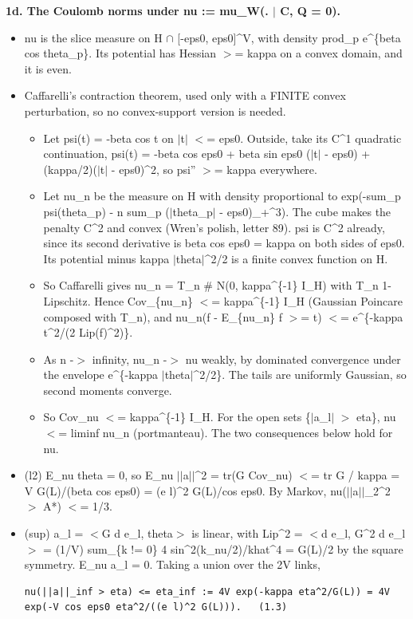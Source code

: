 \documentclass[11pt,a4paper]{article}
\begin{document}
{\bfseries\boldmath 1d. The Coulomb norms under nu := mu\_W(. $|$ C, Q = 0).}

\begin{itemize}
\item{} nu is the slice measure on H $\cap$ [-eps0, eps0]\textasciicircum{}V, with density prod\_p e\textasciicircum{}\{beta cos theta\_p\}. Its potential has Hessian
$>$= kappa on a convex domain, and it is even.
\item{} Caffarelli's contraction theorem, used only with a FINITE convex perturbation, so no convex-support version is
needed.
\begin{itemize}
\item{} Let psi(t) = -beta cos t on $|$t$|$ $<$= eps0. Outside, take its C\textasciicircum{}1 quadratic continuation,
psi(t) = -beta cos eps0 + beta sin eps0 ($|$t$|$ - eps0) + (kappa/2)($|$t$|$ - eps0)\textasciicircum{}2, so psi'' $>$= kappa everywhere.
\item{} Let nu\_n be the measure on H with density proportional to
exp(-sum\_p psi(theta\_p) - n sum\_p ($|$theta\_p$|$ - eps0)\_+\textasciicircum{}3).
The cube makes the penalty C\textasciicircum{}2 and convex (Wren's polish, letter 89). psi is C\textasciicircum{}2 already, since its second
derivative is beta cos eps0 = kappa on both sides of eps0.
Its potential minus kappa $|$theta$|$\textasciicircum{}2/2 is a finite convex function on H.
\item{} So Caffarelli gives nu\_n = T\_n \# N(0, kappa\textasciicircum{}\{-1\} I\_H) with T\_n 1-Lipschitz. Hence Cov\_\{nu\_n\} $<$= kappa\textasciicircum{}\{-1\} I\_H
(Gaussian Poincare composed with T\_n), and nu\_n(f - E\_\{nu\_n\} f $>$= t) $<$= e\textasciicircum{}\{-kappa t\textasciicircum{}2/(2 Lip(f)\textasciicircum{}2)\}.
\item{} As n -$>$ infinity, nu\_n -$>$ nu weakly, by dominated convergence under the envelope e\textasciicircum{}\{-kappa $|$theta$|$\textasciicircum{}2/2\}.
The tails are uniformly Gaussian, so second moments converge.
\item{} So Cov\_nu $<$= kappa\textasciicircum{}\{-1\} I\_H. For the open sets \{$|$a\_l$|$ $>$ eta\}, nu $<$= liminf nu\_n (portmanteau). The two
consequences below hold for nu.
\end{itemize}

\item{} (l2) E\_nu theta = 0, so E\_nu $|$$|$a$|$$|$\textasciicircum{}2 = tr(G Cov\_nu) $<$= tr G / kappa = V G(L)/(beta cos eps0) = (e l)\textasciicircum{}2 G(L)/cos eps0.
By Markov, nu($|$$|$a$|$$|$\_2\textasciicircum{}2 $>$ A*) $<$= 1/3.
\item{} (sup) a\_l = $<$G d e\_l, theta$>$ is linear, with Lip\textasciicircum{}2 = $<$d e\_l, G\textasciicircum{}2 d e\_l$>$ = (1/V) sum\_\{k != 0\} 4 sin\textasciicircum{}2(k\_nu/2)/khat\textasciicircum{}4
= G(L)/2 by the square symmetry. E\_nu a\_l = 0. Taking a union over the 2V links,
\begin{Verbatim}[breaklines=true,breakanywhere=true,fontsize=\small]
nu(||a||_inf > eta) <= eta_inf := 4V exp(-kappa eta^2/G(L)) = 4V exp(-V cos eps0 eta^2/((e l)^2 G(L))).   (1.3)
\end{Verbatim}


\end{itemize}
\end{document}
